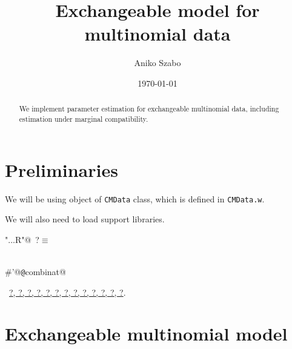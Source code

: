 \documentclass[reqno]{amsart}
\title{Exchangeable model for multinomial data}
\author{Aniko Szabo}
\date{\today}
\renewcommand{\NWtarget}[2]{\hypertarget{#1}{#2}}
\renewcommand{\NWlink}[2]{\hyperlink{#1}{#2}}
\begin{document}
\maketitle


\begin{abstract}
We implement parameter estimation for exchangeable multinomial data, including estimation under marginal compatibility. 
\end{abstract}

\section{Preliminaries}

We will be using object of \texttt{CMData} class, which is defined in \texttt{CMData.w}.

We will also need to load support libraries.

\begin{flushleft} \small
\begin{minipage}{\linewidth}\label{scrap1}\raggedright\small
\NWtarget{nuweb?}{} \verb@"..\R\ExchMultinomial.R"@\nobreak\ {\footnotesize {?}}$\equiv$
\vspace{-1ex}
\begin{list}{}{} \item
\mbox{}\verb@@\\
\mbox{}\verb@#'@{\tt @}\verb@import combinat@\\
\mbox{}\verb@@{\NWsep}
\end{list}
\vspace{-1.5ex}
\footnotesize
\begin{list}{}{\setlength{\itemsep}{-\parsep}\setlength{\itemindent}{-\leftmargin}}
\item \NWtxtFileDefBy\ \NWlink{nuweb?}{?}\NWlink{nuweb?}{, ?}\NWlink{nuweb?}{, ?}\NWlink{nuweb?}{, ?}\NWlink{nuweb?}{, ?}\NWlink{nuweb?}{, ?}\NWlink{nuweb?}{, ?}\NWlink{nuweb?}{, ?}\NWlink{nuweb?}{, ?}\NWlink{nuweb?}{, ?}\NWlink{nuweb?}{, ?}\NWlink{nuweb?}{, ?}\NWlink{nuweb?}{, ?}.

\item{}
\end{list}
\end{minipage}\vspace{4ex}
\end{flushleft}
\section{Exchangeable multinomial model}\label{S:MLE} 
\end{document}
